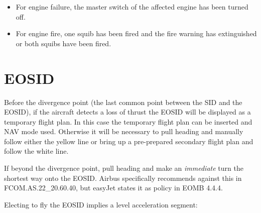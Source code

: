 \documentclass[a5paper,11pt,twoside]{book}
\newcommand{\multicite}[1]{
  \nopagebreak
  \noindent{\footnotesize\color{blue}{[ #1 ]}}
}
\begin{document}
\begin{itemize}
\item For engine failure, the master switch of the affected engine has been
  turned off.

\item For engine fire, one squib has been fired and the fire warning has
  extinguished or both squibs have been fired.
\end{itemize}

\multicite{FCTM~PRO.AEP.ENG}




\section{EOSID}

Before the divergence point (the last common point between the SID and the
EOSID), if the aircraft detects a loss of thrust the EOSID will be displayed as
a temporary flight plan. In this case the temporary flight plan can be inserted
and NAV mode used. Otherwise it will be necessary to pull heading and manually
follow either the yellow line or bring up a pre-prepared secondary flight plan
and follow the white line.

If beyond the divergence point, pull heading and make an \emph{immediate} turn
the shortest way onto the EOSID. Airbus specifically recommends against this in
FCOM.AS.22\_20.60.40, but easyJet states it as policy in EOMB 4.4.4.

Electing to fly the EOSID implies a level acceleration segment:
\end{document}
